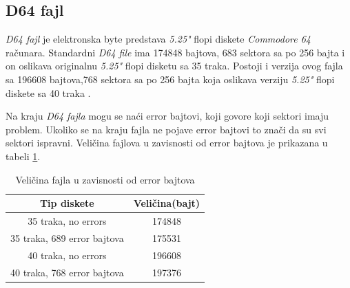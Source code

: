 \subsection{D64 fajl}
\textit{D64 fajl} je elektronska byte predstava \textit{5.25"} flopi diskete \textit{Commodore 64} računara. Standardni \textit{D64 file} ima 174848 bajtova, 683 sektora sa po 256 bajta i on oslikava originalnu \textit{5.25"} flopi disketu sa 35 traka.  Postoji i verzija ovog fajla sa 196608 bajtova,768 sektora sa po 256 bajta koja oslikava verziju \textit{5.25"} flopi diskete sa 40 traka \cite{D64}.

Na kraju \textit{D64 fajla} mogu se naći error bajtovi, koji govore koji sektori imaju problem. Ukoliko se na kraju fajla ne pojave error bajtovi to znači da su svi sektori ispravni. Veličina fajlova u zavisnosti od error bajtova je prikazana u tabeli \ref{tab:error_velicina}.
\begin{table}[h!]
\begin{center}
\begin{tabular}{ | c | c |} 
\hline
Tip diskete & Veličina(bajt) \\
\hline
\hline
35 traka, no errors & 174848 \\
\hline
35 traka, 689 error bajtova & 175531 \\
\hline
40 traka, no errors & 196608 \\
\hline
40 traka, 768 error bajtova & 197376 \\
\hline
\end{tabular}
\end{center}
\caption{Veličina fajla u zavisnosti od error bajtova}
\label{tab:error_velicina}
\end{table}
